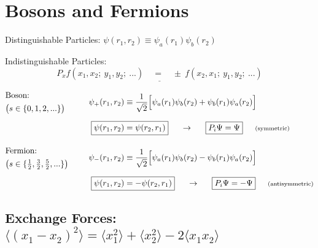 \documentclass[12pt]{article}
\begin{document}
\newpage
\section{Bosons and Fermions}

\vspace{5pt} \noindent
Distinguishable Particles: \indent
\(\boxed{ \psi(r_1,r_2) \equiv \psi_a(r_1) \psi_b(r_2) }\)

\vspace{15pt} \noindent
Indistinguishable Particles:
\[\underline{P_x f(x_1, x_2; \ y_1, y_2; \ ...) \quad = \quad \pm \ f(x_2, x_1; \ y_1, y_2; \ ...)}\]

\vspace{5pt} \indent \(\begin{aligned}
    &\begin{aligned}
        &\text{Boson:}\\
        &\big( s \in \{ 0,1,2,... \} \big)
    \end{aligned}& \indent \psi_+(r_1,r_2) 
        &\equiv \frac{1}{\sqrt{2}} \Big[ \psi_a(r_1) \psi_b(r_2) + \psi_b(r_1) \psi_a(r_2) \Big] \\[5pt]
        && \Aboxed{ \psi(r_1,r_2) &= \psi(r_2,r_1) } 
        \indent \rightarrow \indent \boxed{P_i \Psi = \Psi} 
        \indent \text{\scriptsize(symmetric)}\\[10pt]
    &\begin{aligned}
        &\text{Fermion:}\\
        &\big( s \in \{ \tfrac{1}{2}, \tfrac{3}{2}, \tfrac{5}{2}, ... \} \big)
    \end{aligned}& \indent \psi_-(r_1,r_2) 
        &\equiv \frac{1}{\sqrt{2}} \Big[ \psi_a(r_1) \psi_b(r_2) - \psi_b(r_1) \psi_a(r_2) \Big]\\[5pt]
        && \Aboxed{ \psi(r_1,r_2) &= - \psi(r_2,r_1) }
        \indent \rightarrow \indent \boxed{P_i \Psi = - \Psi} 
        \indent \text{\scriptsize(antisymmetric)}
\end{aligned}\)

\subsection{Exchange Forces: \indent \(\Big\langle (x_1 - x_2)^2 \Big\rangle 
    = \langle x_1^2 \rangle + \langle x_2^2 \rangle 
    - 2 \langle x_1 x_2 \rangle\)}
\end{document}
